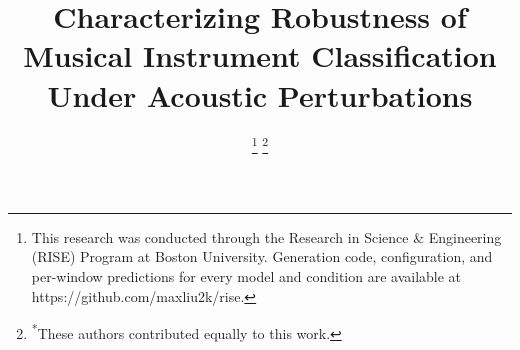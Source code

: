 \documentclass[conference]{IEEEtran}
\begin{document}
\title{Characterizing Robustness of Musical Instrument Classification Under Acoustic Perturbations}

\author{
\and
{}
\and
{}
\and
{}
\thanks{This research was conducted through the Research in Science \&
Engineering (RISE) Program at Boston University. Generation code, configuration,
and per-window predictions for every model and condition are available at
https://github.com/maxliu2k/rise.}
\thanks{\textsuperscript{*}These authors contributed equally to this work.}
}
\end{document}
